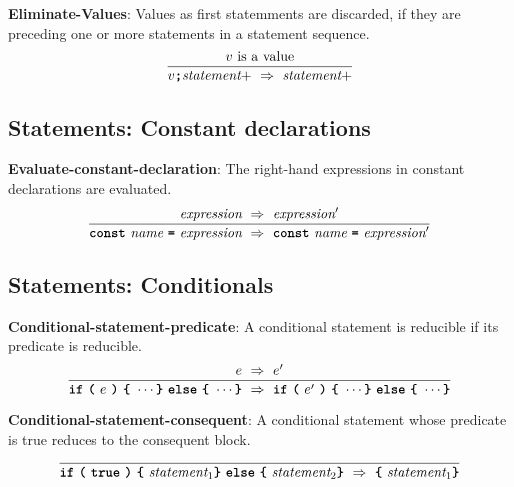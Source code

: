 \vspace{10mm}
\textbf{Eliminate-Values}: Values as first statemments are discarded, if
they are preceding one or more statements in a statement sequence.
\[
\frac{
v \ \mbox{is a value}  
}{
v \textbf{\texttt{;}} \textit{statement}+\ 
   \Rightarrow  \ 
  \textit{statement}+
}
\]

\subsection*{Statements: Constant declarations}

\textbf{Evaluate-constant-declaration}: The right-hand expressions
in constant declarations are evaluated.
\[
\frac{
  \textit{expression}
  \ \Rightarrow \ 
  \textit{expression}'
}{
  \textbf{\texttt{const}}\  \textit{name} \ 
  \textbf{\texttt{=}}\  \textit{expression} \ 
  \Rightarrow \ 
  \textbf{\texttt{const}}\  \textit{name} \ 
  \textbf{\texttt{=}}\  \textit{expression}'
}
\]


\subsection*{Statements: Conditionals}

\textbf{Conditional-statement-predicate}: A conditional statement
is reducible if its predicate is reducible.
\[
\frac{
  e\ \Rightarrow\ e'
}{  
  \textbf{\texttt{if}}\ 
  \textbf{\texttt{(}}\ 
  e \ 
  \textbf{\texttt{)}} \ 
  \textbf{\texttt{\{}} \
  \cdots  
  \textbf{\texttt{\}}} \ 
  \textbf{\texttt{else}} \ 
  \textbf{\texttt{\{}} \
  \cdots  
  \textbf{\texttt{\}}}
\ 
  \Rightarrow \ 
  \textbf{\texttt{if}}\ 
  \textbf{\texttt{(}}\ 
  e' \ 
  \textbf{\texttt{)}} \ 
  \textbf{\texttt{\{}} \
  \cdots  
  \textbf{\texttt{\}}} \ 
  \textbf{\texttt{else}} \ 
  \textbf{\texttt{\{}} \
  \cdots  
  \textbf{\texttt{\}}}
}
\]

\vspace{10mm}

\textbf{Conditional-statement-consequent}: A conditional statement
whose predicate is true reduces to the consequent block.
\[
\frac{
}{  
  \textbf{\texttt{if}}\ 
  \textbf{\texttt{(}}\ 
  \textbf{\texttt{true}} \ 
  \textbf{\texttt{)}} \ 
  \textbf{\texttt{\{}} \
  \textit{statement}_1
  \textbf{\texttt{\}}} \ 
  \textbf{\texttt{else}} \ 
  \textbf{\texttt{\{}} \
\textit{statement}_2  
  \textbf{\texttt{\}}}
  \ 
  \Rightarrow  \ 
  \textbf{\texttt{\{}} \
  \textit{statement}_1  
  \textbf{\texttt{\}}}
}
\]

